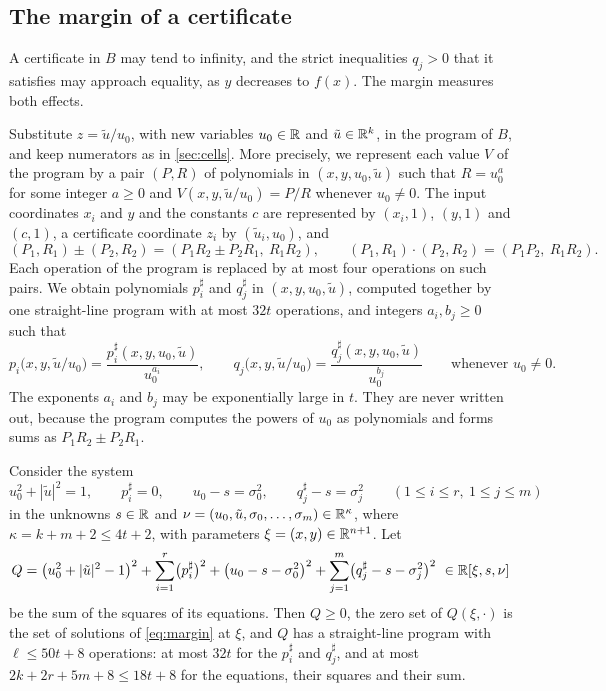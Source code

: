 \subsection{The margin of a certificate}\label{sec:universal-margin}

A certificate in $B$ may tend to infinity, and the strict inequalities $q_j>0$ that it satisfies may approach equality, as $y$ decreases to $f(x)$. The margin measures both effects.

Substitute $z=\tilde u/u_0$, with new variables $u_0\in\mathbb{R}$ and $\tilde u\in\mathbb{R}^k$, in the program of $B$, and keep numerators as in \cref{sec:cells}. More precisely, we represent each value $V$ of the program by a pair $(P,R)$ of polynomials in $(x,y,u_0,\tilde u)$ such that $R=u_0^a$ for some integer $a\ge0$ and $V(x,y,\tilde u/u_0)=P/R$ whenever $u_0\ne0$. The input coordinates $x_i$ and $y$ and the constants $c$ are represented by $(x_i,1)$, $(y,1)$ and $(c,1)$, a certificate coordinate $z_i$ by $(\tilde u_i,u_0)$, and
\[
(P_1,R_1)\pm(P_2,R_2)=(P_1R_2\pm P_2R_1,\ R_1R_2),\qquad(P_1,R_1)\cdot(P_2,R_2)=(P_1P_2,\ R_1R_2).
\]
Each operation of the program is replaced by at most four operations on such pairs. We obtain polynomials $p_i^\sharp$ and $q_j^\sharp$ in $(x,y,u_0,\tilde u)$, computed together by one straight-line program with at most $32t$ operations, and integers $a_i,b_j\ge0$ such that
\[
p_i\bigl(x,y,\tilde u/u_0\bigr)=\frac{p_i^\sharp(x,y,u_0,\tilde u)}{u_0^{a_i}},\qquad q_j\bigl(x,y,\tilde u/u_0\bigr)=\frac{q_j^\sharp(x,y,u_0,\tilde u)}{u_0^{b_j}}\qquad\text{whenever }u_0\ne0 .
\]
The exponents $a_i$ and $b_j$ may be exponentially large in $t$. They are never written out, because the program computes the powers of $u_0$ as polynomials and forms sums as $P_1R_2\pm P_2R_1$.

Consider the system
\begin{equation}\label{eq:margin}
u_0^2+|\tilde u|^2=1,\qquad p_i^\sharp=0,\qquad u_0-s=\sigma_0^2,\qquad q_j^\sharp-s=\sigma_j^2\qquad(1\le i\le r,\ 1\le j\le m)
\end{equation}
in the unknowns $s\in\mathbb{R}$ and $\nu=(u_0,\tilde u,\sigma_0,\dots,\sigma_m)\in\mathbb{R}^\kappa$, where $\kappa=k+m+2\le4t+2$, with parameters $\xi=(x,y)\in\mathbb{R}^{n+1}$. Let
\[
Q=\bigl(u_0^2+|\tilde u|^2-1\bigr)^2+\sum_{i=1}^r\bigl(p_i^\sharp\bigr)^2+\bigl(u_0-s-\sigma_0^2\bigr)^2+\sum_{j=1}^m\bigl(q_j^\sharp-s-\sigma_j^2\bigr)^2\ \in\RR[\xi,s,\nu]
\]
be the sum of the squares of its equations. Then $Q\ge0$, the zero set of $Q(\xi,\cdot)$ is the set of solutions of \eqref{eq:margin} at $\xi$, and $Q$ has a straight-line program with $\ell\le50t+8$ operations: at most $32t$ for the $p_i^\sharp$ and $q_j^\sharp$, and at most $2k+2r+5m+8\le18t+8$ for the equations, their squares and their sum.

